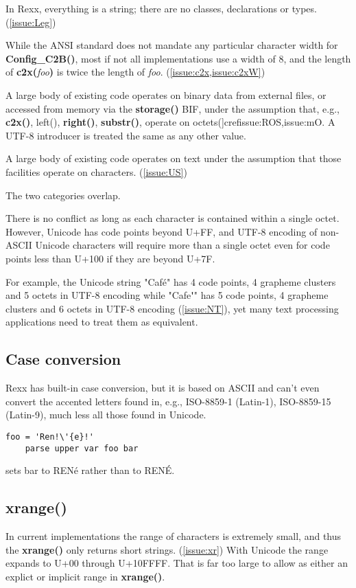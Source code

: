 \documentclass[b4paper]{article}
\begin{document}
In Rexx, everything is a string; there are no classes, declarations or types. (\cref{issue:Leg})

While the ANSI standard does not mandate any particular character width for \textbf{Config\_C2B()},
most if not all implementations use a width of 8,
and the length of \textbf{c2x(}\textit{foo}\textbf{)}
is twice the length of \textit{foo}. (\cref{issue:c2x,issue:c2xW})

A large body of existing code operates on binary data from external files,
or accessed from memory via the \textbf{storage()} BIF,
under the assumption that, e.g., \textbf{c2x()}, left(), \textbf{right()}, \textbf{substr()}, operate on octets(]cref{issue:ROS,issue:mO}.
A UTF-8 introducer is treated the same as any other value.

A large body of existing code operates on text under the assumption
that those facilities operate on characters. (\cref{issue:US})

The two categories overlap.

There is no conflict as long as each character is contained within a single octet.
However, Unicode has code points beyond U+FF,
and UTF-8 encoding of non-ASCII Unicode characters will
require more than a single octet even for code points less than U+100 if they are beyond U+7F.

For example, the Unicode string "Caf\'{e}" has 4 code points, 4
grapheme clusters and 5 octets in UTF-8 encoding while
"Cafe\textbf{\'{ }}" has 5 code points, 4 grapheme clusters and 6 octets
in UTF-8 encoding (\cref{issue:NT}), yet many text processing applications need to treat
them as equivalent.

\subsection{Case conversion}
Rexx has built-in case conversion, but it is based on ASCII and
can't even convert the accented letters found in, e.g., ISO-8859-1
(Latin-1), ISO-8859-15 (Latin-9), much less all those found in Unicode.

\begin{lstlisting}[caption={Non-ASCII upper casing in classic Rexx}]
    foo = 'Ren!\'{e}!'
    parse upper var foo bar
\end{lstlisting}

sets bar to REN\'{e} rather than to REN\'{E}.

\subsection{\textbf{xrange()}}
In current implementations the range of characters is extremely small,
and thus the \textbf{xrange()} only returns short strings. (\cref{issue:xr})
With Unicode the range expands to U+00 through U+10FFFF.
That is far too large to allow as either an explict or implicit range in \textbf{xrange()}.
\end{document}
